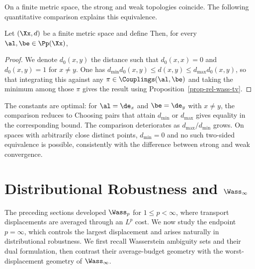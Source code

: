 On a finite metric space, the strong and weak topologies coincide. The following quantitative comparison explains this equivalence.

\begin{prop}
		Let $(\Xx,d)$ be a finite metric space and define
		Then, for every $\al,\be\in\Pp(\Xx)$,
\end{prop}

\begin{proof}
	We denote $d_0(x,y)$ the distance such that $d_0(x,x)=0$ and $d_0(x,y)=1$ for $x \neq y$. One has
	\(d_{\min} d_0(x,y) \leq d(x,y) \leq d_{\max} d_0(x,y)\),
	so that integrating this against any $\pi \in \Couplings(\al,\be)$ and taking the minimum among those $\pi$ gives the result using Proposition~\ref{prop-rel-wass-tv}.
\end{proof}

The constants are optimal: for $\al=\de_x$ and $\be=\de_y$ with $x\neq y$, the comparison reduces to
%
Choosing pairs that attain $d_{\min}$ or $d_{\max}$ gives equality in the corresponding bound. The comparison deteriorates as $d_{\max}/d_{\min}$ grows. On spaces with arbitrarily close distinct points, $d_{\min}=0$ and no such two-sided equivalence is possible, consistently with the difference between strong and weak convergence.

\section{Distributional Robustness and \texorpdfstring{$\Wass_\infty$}{W-infinity}}
\label{sec-dro-wasserstein-infinity}

The preceding sections developed $\Wass_p$ for $1\leq p<\infty$, where transport displacements are averaged through an $L^p$ cost. We now study the endpoint $p=\infty$, which controls the largest displacement and arises naturally in distributional robustness. We first recall Wasserstein ambiguity sets and their dual formulation, then contrast their average-budget geometry with the worst-displacement geometry of $\Wass_\infty$.

